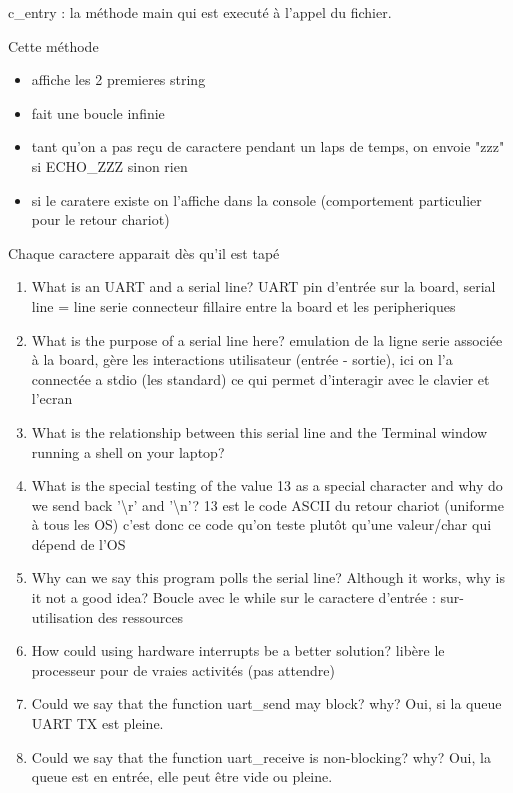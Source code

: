 \documentclass[10]{article}
\begin{document}
c_entry : la méthode main qui est executé à l'appel du fichier. 

Cette méthode

\begin{itemize}
  \item affiche les 2 premieres string
  \item fait une boucle infinie
  \item tant qu'on a pas reçu de caractere pendant un laps de temps, on envoie "zzz" si ECHO_ZZZ sinon rien
  \item si le caratere existe on l'affiche dans la console (comportement particulier pour le retour chariot)
\end{itemize}

Chaque caractere apparait dès qu'il est tapé


\begin{enumerate}
\item
  What is an UART and a serial line? 
  UART pin d'entrée sur la board, serial line = line serie connecteur fillaire entre la board et les peripheriques
\item
  What is the purpose of a serial line here?
  emulation de la ligne serie associée à la board, gère les interactions utilisateur (entrée - sortie), ici on l'a connectée a stdio (les standard) ce qui permet d'interagir avec le clavier et l'ecran
\item
  What is the relationship between this serial line
  and the Terminal window running a shell on your laptop?
\item
  What is the special testing of the value 13 as a special
  character and why do we send back '\textbackslash r' and '\textbackslash n'?
  13 est le code ASCII du retour chariot (uniforme à tous les OS) c'est donc ce code qu'on teste plutôt qu'une valeur/char qui dépend de l'OS
\item
  Why can we say this program polls the serial line?
  Although it works, why is it not a good idea?
  Boucle avec le while sur le caractere d'entrée : sur-utilisation des ressources 
\item
  How could using hardware interrupts be a better solution?
  libère le processeur pour de vraies activités (pas attendre)
\item
  Could we say that the function uart\_send may block? why?
  Oui, si la queue UART TX est pleine.
\item
  Could we say that the function uart\_receive is non-blocking? why?
  Oui, la queue est en entrée, elle peut être vide ou pleine.

\end{enumerate}
\end{document}
